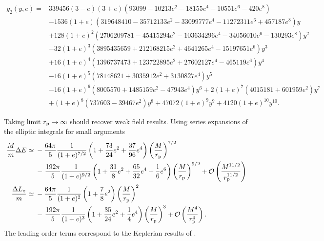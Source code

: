 \begin{align}
g_2(y, e) = {} & 339456 (3 - e) (3 + e) \left(93099 - 10213 e^2 - 18155 e^4 - 10551 e^6 - 420 e^8 \right) \nonumber \\
 {} & - \left. 1536 (1 + e) \left(319648410 - 35712133 e^2 - 33099777 e^4 - 11272311 e^6 + 457187 e^8\right) y \right. \nonumber \\
 {} & + \left. 128 (1 + e)^2 \left(2706209781 - 45415294 e^2 - 103634296 e^4 - 34056010 e^6 - 130293 e^8\right) y^2 \right. \nonumber \\
 {} & - \left. 32 (1 + e)^3 \left(3895435659 + 212168215 e^2 + 4641265 e^4 - 15197651 e^6 \right) y^3 \right. \nonumber \\
 {} & + \left. 16 (1 + e)^4 \left(1396737473 + 123722895 e^2 + 27602127 e^4 - 465119 e^6 \right) y^4 \right. \nonumber \\
 {} & - \left. 16 (1 + e)^5 \left(78148621 + 3035912 e^2 + 3130827 e^4\right) y^5 \right. \nonumber \\
 {} & - \left. 16 (1 + e)^6 \left(8005570 + 1485159 e^2 - 47943 e^4\right) y^6 + 2 (1 + e)^7 \left(4015181 + 601959 e^2\right) y^7 \right. \nonumber \\
 {} & + \left. (1 + e)^8 \left(737603 - 39467 e^2\right) y^8 + 47072 (1 + e)^9 y^9 + 4120 (1 + e)^{10} y^{10}. \right.
\end{align}

Taking limit $r_\mathrm{p} \rightarrow \infty$ should recover weak field results. Using series expansions of the elliptic integrals for small arguments
\begin{align}
\frac{M}{m} \upDelta E \simeq {} & -\frac{64\pi}{5} \recip{(1 + e)^{{7}/{2}}} \left(1 + \frac{73}{24} e^2 + \frac{37}{96} e^{4}\right) \left(\frac{M}{r\sub{p}}\right)^{7/2} \nonumber \\
 {} & - \left. \frac{192\pi}{5} \recip{(1 + e)^{{9}/{2}}} \left(1 + \frac{31}{8} e^2 + \frac{65}{32} e^4 + \frac{1}{6}e^6\right) \left(\frac{M}{r\sub{p}}\right)^{9/2} + \order{\frac{M^{11/2}}{r\sub{p}^{11/2}}} \right. \\
\frac{\upDelta L_{z}}{m} \simeq {} & -\frac{64\pi}{5} \recip{(1 + e)^{2}} \left(1 + \frac{7}{8} e^{2}\right) \left(\frac{M}{r\sub{p}}\right)^{2} \nonumber \\
 {} & - \left. \frac{192 \pi}{5} \recip{(1 + e)^3} \left(1 + \frac{35}{24} e^2 + \frac{1}{4} e^4\right) \left(\frac{M}{r\sub{p}}\right)^{3}  + \order{\frac{M^{4}}{r\sub{p}^{4}}}. \right.
\end{align}
The leading order terms correspond to the Keplerian results of \cite{Peters1964}.

